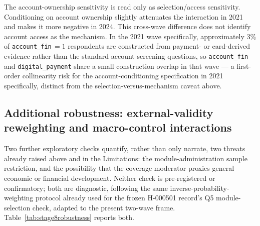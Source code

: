 The account-ownership sensitivity is read only as selection/access sensitivity. Conditioning
on account ownership slightly attenuates the interaction in 2021 and makes it more negative
in 2024. This cross-wave difference does not identify account access as the mechanism. In
the 2021 wave specifically, approximately 3\% of \texttt{account\_fin}\,$=1$ respondents are
constructed from payment- or card-derived evidence rather than the standard
account-screening questions, so \texttt{account\_fin} and \texttt{digital\_payment} share a
small construction overlap in that wave --- a first-order collinearity risk for the
account-conditioning specification in 2021 specifically, distinct from the
selection-versus-mechanism caveat above.

\subsection{Additional robustness: external-validity reweighting and macro-control interactions}

Two further exploratory checks quantify, rather than only narrate, two threats already
raised above and in the Limitations: the module-administration sample restriction, and the
possibility that the coverage moderator proxies general economic or financial development.
Neither check is pre-registered or confirmatory; both are diagnostic, following the same
inverse-probability-weighting protocol already used for the frozen H-000501 record's Q5
module-selection check, adapted to the present two-wave frame.
Table~\ref{tab:stage8robustness} reports both.

